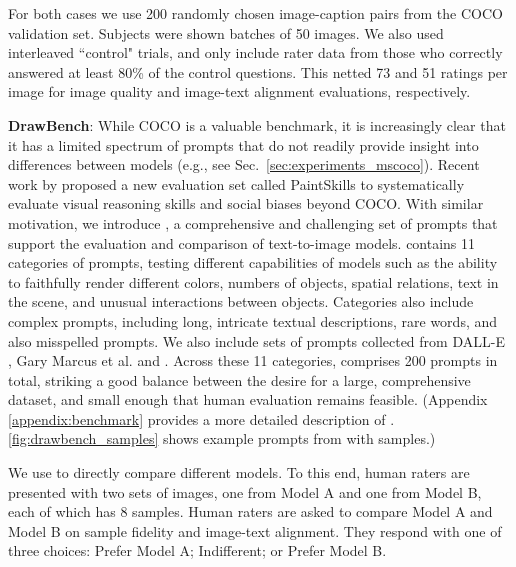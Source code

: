 For both cases we use 200 randomly chosen image-caption pairs from the COCO validation set. Subjects were shown batches of 50 images. We also used interleaved ``control" trials, and only include rater data from those who correctly answered at least 80\% of the control questions. This netted 73 and 51 ratings per image for image quality and image-text alignment evaluations, respectively.

\textbf{DrawBench}:
While COCO is a valuable benchmark, it is increasingly clear that it has a limited spectrum of prompts that do not readily provide insight into differences between models (e.g., see Sec.\  \ref{sec:experiments_mscoco}). 
Recent work by \citep{dalleval} proposed a new evaluation set called PaintSkills to systematically evaluate visual reasoning skills and social biases beyond COCO. 
With similar motivation, we introduce \emph{\benchmarkname}, a comprehensive and challenging set of prompts that support the evaluation and comparison of text-to-image models.
\benchmarkname contains 11 categories of prompts, testing different capabilities of models such as the ability to faithfully render different colors, numbers of objects, spatial relations, text in the scene, and unusual interactions between objects. Categories also include complex prompts, including long, intricate textual descriptions, rare words, and also misspelled prompts. We also include sets of prompts collected from DALL-E \cite{ramesh-dalle}, Gary Marcus et al. \cite{marcus-arxiv-2022} and \href{https://reddit.com/r/dalle2/}{\color{black}{Reddit}}.
Across these 11 categories,  \benchmarkname comprises 200 prompts in total, striking a good balance between the desire for a large, comprehensive dataset, and small enough that human evaluation remains feasible.
(Appendix \ref{appendix:benchmark} provides a more detailed description of \benchmarkname. \cref{fig:drawbench_samples} shows example prompts from \benchmarkname with \name samples.)

We use \benchmarkname to directly compare different models. To this end, human raters are presented with two sets of images, one from Model A and one from Model B, each of which has 8 samples. Human raters are asked to compare Model A and Model B on sample fidelity and image-text alignment. They respond with one of three choices: Prefer Model A; Indifferent; or Prefer Model B. 


